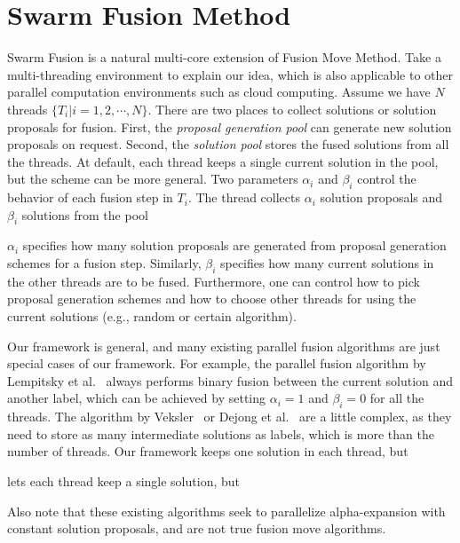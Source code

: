 \section{Swarm Fusion Method}
  Swarm Fusion is a natural
multi-core extension of Fusion Move Method. Take a multi-threading
environment to explain our idea, which is also applicable to other
parallel computation environments such as cloud computing. Assume we
have $N$ threads $\{T_i | i=1, 2, \cdots, N\}$. There are two places to
collect solutions or solution proposals for fusion. First, the {\it
proposal generation pool} can generate new solution proposals on
request. Second, the {\it solution pool} stores the fused solutions from
all the threads. At default, each thread keeps a single current solution
in the pool, but the scheme can be more general.  Two parameters
$\alpha_i$ and $\beta_i$ control the behavior of each fusion step in
$T_i$. The thread collects $\alpha_i$ solution proposals and $\beta_i$
solutions from the pool 



$\alpha_i$ specifies how many solution proposals are generated
from proposal generation schemes for a fusion step. Similarly, $\beta_i$
specifies how many current solutions in the other threads are to be
fused. Furthermore, one can control how to pick proposal generation
schemes and how to choose other threads for using the current solutions
(e.g., random or certain algorithm).


Our framework is general, and many existing parallel fusion algorithms
are just special cases of our framework.
%
For example, the parallel fusion algorithm by Lempitsky et
al.~\cite{viktor} always performs binary fusion between the current
solution and another label, which can be achieved by setting $\alpha_i =
1$ and $\beta_i = 0$ for all the threads. The algorithm by
Veksler~\cite{olga} or Dejong et al.~\cite{dejong} are a little complex,
as they need to store as many intermediate solutions as labels, which is
more than the number of threads. Our framework keeps one solution in
each thread, but 

lets each thread keep a
single solution, but 









Also note that these existing algorithms seek to parallelize
alpha-expansion with constant solution proposals, and are not true
fusion move algorithms.





